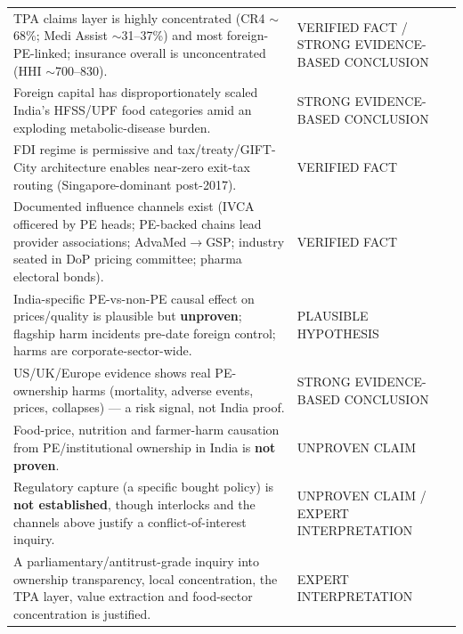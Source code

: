 \documentclass[11pt,a4paper]{article}
\begin{document}
\begin{small}
\begin{longtable}{>{\raggedright\arraybackslash}p{12.0cm} >{\raggedright\arraybackslash}p{3.2cm}}
TPA claims layer is highly concentrated (CR4 $\sim$68\%; Medi Assist $\sim$31--37\%) and most foreign-PE-linked; insurance overall is unconcentrated (HHI $\sim$700--830). & VERIFIED FACT / STRONG EVIDENCE-BASED CONCLUSION \\
Foreign capital has disproportionately scaled India's HFSS/UPF food categories amid an exploding metabolic-disease burden. & STRONG EVIDENCE-BASED CONCLUSION \\
FDI regime is permissive and tax/treaty/GIFT-City architecture enables near-zero exit-tax routing (Singapore-dominant post-2017). & VERIFIED FACT \\
Documented influence channels exist (IVCA officered by PE heads; PE-backed chains lead provider associations; AdvaMed$\rightarrow$GSP; industry seated in DoP pricing committee; pharma electoral bonds). & VERIFIED FACT \\
India-specific PE-vs-non-PE causal effect on prices/quality is plausible but \textbf{unproven}; flagship harm incidents pre-date foreign control; harms are corporate-sector-wide. & PLAUSIBLE HYPOTHESIS \\
US/UK/Europe evidence shows real PE-ownership harms (mortality, adverse events, prices, collapses) --- a risk signal, not India proof. & STRONG EVIDENCE-BASED CONCLUSION \\
Food-price, nutrition and farmer-harm causation from PE/institutional ownership in India is \textbf{not proven}. & UNPROVEN CLAIM \\
Regulatory capture (a specific bought policy) is \textbf{not established}, though interlocks and the channels above justify a conflict-of-interest inquiry. & UNPROVEN CLAIM / EXPERT INTERPRETATION \\
A parliamentary/antitrust-grade inquiry into ownership transparency, local concentration, the TPA layer, value extraction and food-sector concentration is justified. & EXPERT INTERPRETATION \\
\end{longtable}
\end{small}

\end{document}
